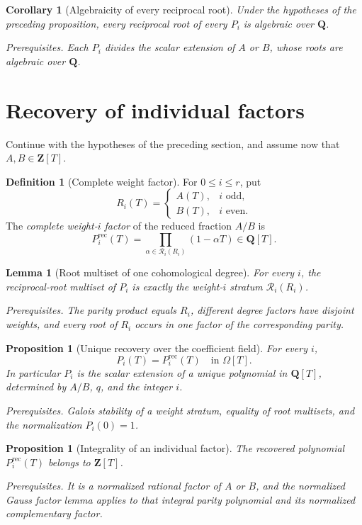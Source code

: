 \documentclass[10pt]{article}
\newtheorem{proposition}[theorem]{Proposition}
\newtheorem{corollary}[theorem]{Corollary}
\newtheorem{lemma}[theorem]{Lemma}
\theoremstyle{definition}
\newtheorem{definition}[theorem]{Definition}
\newcommand{\deps}[1]{\par\smallskip\noindent\textit{Prerequisites.} #1}
\begin{document}
\begin{corollary}[Algebraicity of every reciprocal root]
Under the hypotheses of the preceding proposition, every reciprocal root
of every \(P_i\) is algebraic over \(\mathbf Q\).
\deps{Each \(P_i\) divides the scalar extension of \(A\) or \(B\), whose
roots are algebraic over \(\mathbf Q\).}
\end{corollary}

\section{Recovery of individual factors}

Continue with the hypotheses of the preceding section, and assume now that
\(A,B\in\mathbf Z[T]\).

\begin{definition}[Complete weight factor]
For \(0\leq i\leq r\), put
\[
 R_i(T)=
 \begin{cases}
  A(T),&i\text{ odd},\\
  B(T),&i\text{ even}.
 \end{cases}
\]
The \emph{complete weight-\(i\) factor} of the reduced fraction \(A/B\) is
\[
 P_i^{\mathrm{rec}}(T)
 =\prod_{\alpha\in\mathcal R_i(R_i)}(1-\alpha T)
 \in\mathbf Q[T].
\]
\end{definition}

\begin{lemma}[Root multiset of one cohomological degree]
For every \(i\), the reciprocal-root multiset of \(P_i\) is exactly the
weight-\(i\) stratum \(\mathcal R_i(R_i)\).
\deps{The parity product equals \(R_i\), different degree factors have
disjoint weights, and every root of \(R_i\) occurs in one factor of the
corresponding parity.}
\end{lemma}

\begin{proposition}[Unique recovery over the coefficient field]
For every \(i\),
\[
 P_i(T)=P_i^{\mathrm{rec}}(T)
 \quad\text{in }\Omega[T].
\]
In particular \(P_i\) is the scalar extension of a unique polynomial in
\(\mathbf Q[T]\), determined by \(A/B\), \(q\), and the integer \(i\).
\deps{Galois stability of a weight stratum, equality of root multisets,
and the normalization \(P_i(0)=1\).}
\end{proposition}

\begin{proposition}[Integrality of an individual factor]
The recovered polynomial \(P_i^{\mathrm{rec}}(T)\) belongs to
\(\mathbf Z[T]\).
\deps{It is a normalized rational factor of \(A\) or \(B\), and the
normalized Gauss factor lemma applies to that integral parity polynomial
and its normalized complementary factor.}
\end{proposition}
\end{document}
